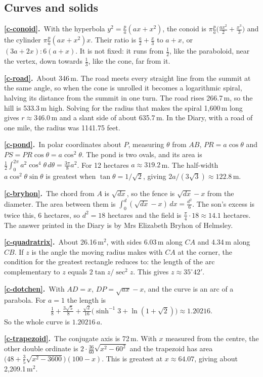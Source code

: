 \documentclass[11pt,a4paper]{article}
\newcommand{\ans}[2]{\par\smallskip\noindent\textbf{\ref{#1}.}\ #2}
\begin{document}
\subsection*{Curves and solids}
\ans{c-conoid}{With the hyperbola $y^2 = \tfrac pa(ax + x^2)$, the conoid is
$\pi\tfrac pa\bigl(\tfrac{ax^2}2 + \tfrac{x^3}3\bigr)$ and the cylinder
$\pi\tfrac pa(ax+x^2)x$. Their ratio is $\tfrac a2 + \tfrac x3$ to $a + x$, or
$(3a + 2x) : 6(a+x)$. It is not fixed: it runs from $\tfrac12$, like the paraboloid, near
the vertex, down towards $\tfrac13$, like the cone, far from it.}
\ans{c-road}{About 346\,m. The road meets every straight line from the summit at the
same angle, so when the cone is unrolled it becomes a logarithmic spiral, halving its
distance from the summit in one turn. The road rises 266.7\,m, so the hill is 533.3\,m
high. Solving for the radius that makes the spiral 1,600\,m long gives $r \approx 346.0$\,m
and a slant side of about 635.7\,m. In the Diary, with a road of one mile, the radius was
1141.75 feet.}
\ans{c-pond}{In polar coordinates about $P$, measuring $\theta$ from $AB$, $PR = a\cos\theta$
and $PS = PR\cos\theta = a\cos^2\theta$. The pond is two ovals, and its area is
$\tfrac12\int_0^{2\pi}a^2\cos^4\theta\,d\theta = \tfrac{3\pi}8a^2$. For 12 hectares
$a \approx 319.2$\,m. The half-width $a\cos^2\theta\sin\theta$ is greatest when
$\tan\theta = 1/\sqrt2$, giving $2a/(3\sqrt3)\approx122.8$\,m.}
\ans{c-bryhon}{The chord from $A$ is $\sqrt{dx}$, so the fence is $\sqrt{dx}-x$ from the
diameter. The area between them is $\int_0^d(\sqrt{dx}-x)\,dx = \tfrac{d^2}6$. The son's
excess is twice this, 6 hectares, so $d^2 = 18$ hectares and the field is
$\tfrac\pi4\cdot18 \approx 14.1$ hectares. The answer printed in the Diary is by Mrs
Elizabeth Bryhon of Helmsley.}
\ans{c-quadratrix}{About 26.16\,m$^2$, with sides 6.03\,m along $CA$ and 4.34\,m along
$CB$. If $z$ is the angle the moving radius makes with $CA$ at the corner, the condition
for the greatest rectangle reduces to: the length of the arc complementary to $z$ equals
$2\tan z/\sec^2 z$. This gives $z \approx 35^\circ42'$.}
\ans{c-dotchen}{With $AD = x$, $DP = \sqrt{ax}-x$, and the curve is an arc of a parabola.
For $a = 1$ the length is
\[\tfrac18 + \tfrac{3\sqrt5}8 + \tfrac{\sqrt2}{16}\bigl(\sinh^{-1}3 + \ln(1+\sqrt2)\bigr)
\approx 1.20216.\]
So the whole curve is $1.20216\,a$.}
\ans{c-trapezoid}{The conjugate axis is 72\,m. With $x$ measured from the centre, the
other double ordinate is $2\cdot\tfrac{36}{60}\sqrt{x^2-60^2}$ and the trapezoid has area
$\bigl(48 + \tfrac35\sqrt{x^2-3600}\bigr)(100 - x)$. This is greatest at $x \approx 64.07$,
giving about 2,209.1\,m$^2$.}
\end{document}
